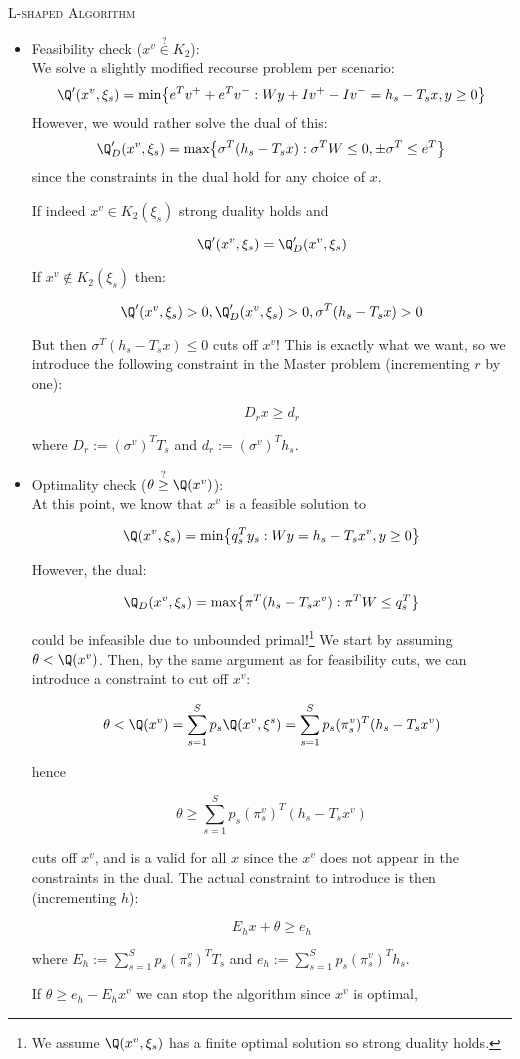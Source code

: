 \textsc{L-shaped Algorithm}
\begin{itemize}
\item Feasibility check ($x^v \stackrel{?}{\in} K_2$):\\

We solve a slightly modified recourse problem per scenario:\\
\[
\Q'(x^v, \xi_s) = \textrm{min} \big\{ e^T v^+ + e^T v^- : Wy + Iv^+ - Iv^- = h_s - T_s x, y \geq 0 \big\}
\]
However, we would rather solve the dual of this:
\[
\Q_D'(x^v, \xi_s) = \textrm{max} \big\{ \sigma^T (h_s - T_s x) : \sigma^T W \leq 0, \pm \sigma^T \leq e^T \big\}
\]
since the constraints in the dual hold for any choice of $x$.

If indeed $x^v \in K_2(\xi_s)$ strong duality holds and

\[
\Q'(x^v, \xi_s) = \Q_D'(x^v, \xi_s)
\]

If $x^v \notin K_2(\xi_s)$ then:

\[
\Q'(x^v, \xi_s) > 0, \Q_D'(x^v, \xi_s) > 0, \sigma^T(h_s- T_s x) > 0
\]

But then $\sigma^T(h_s- T_s x) \leq 0$ cuts off $x^v$! This is 
exactly what we want, so we introduce the following constraint
in the Master problem (incrementing $r$ by one):

\[
D_{r} x \geq d_{r}
\]

where $D_{r} := (\sigma^v)^T T_s$ and $d_{r} := (\sigma^v)^T h_s$.

\item Optimality check ($\theta \stackrel{?}{\geq} \Q(x^v)$):\\

At this point, we know that $x^v$ is a feasible solution to

\[
\Q(x^v, \xi_s) = \textrm{min} \big\{ q_s^T y_s: Wy = h_s - T_s x^v, y \geq 0 \big\}
\]

However, the dual:

\[
\Q_D(x^v, \xi_s) = \textrm{max} \big\{ \pi^T (h_s - T_s x^v) : \pi^T W \leq q_s^T \big\}
\]

could be infeasible due to unbounded primal!\footnote{We assume $\Q(x^v, \xi_s)$
has a finite optimal solution so strong duality holds.}
We start by assuming $\theta < \Q(x^v)$. Then, by the same argument as for
feasibility cuts, we can introduce a constraint to cut off $x^v$:

\[
\theta < \Q(x^v) = \sum_{s=1}^S p_s \Q(x^v, \xi^s)= \sum_{s=1}^S p_s (\pi_s^v)^T(h_s - T_s x^v)
\]

hence

\[
\theta \geq \sum_{s=1}^S p_s (\pi_s^v)^T(h_s - T_s x^v)
\]

cuts off $x^v$, and is a valid for all $x$ since the $x^v$ does not appear in the
constraints in the dual. The actual constraint to introduce is then (incrementing $h$):

\[
E_{h} x + \theta \geq e_{h}
\]

where $E_{h} := \sum_{s=1}^S p_s (\pi_s^v)^T T_s$ and $e_h := \sum_{s=1}^S p_s (\pi_s^v)^T h_s$.

If $\theta \geq e_h - E_h x^v$ we can stop the algorithm since $x^v$ is optimal,

\end{itemize}

